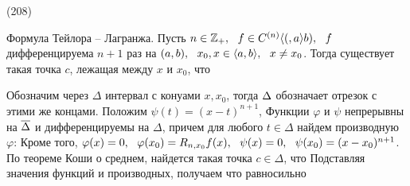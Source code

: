 (208)

\T \q Формула Тейлора -- Лагранжа. Пусть $n \in \mathbb{Z}_+,\ \  f \in C^{(n)} \langle (, a \rangle b),\ \  f$ дифференцируема $n + 1$ раз на $(a, b),\ \  x_0, x \in \langle a, b \rangle,\ \  x \neq x_0$. Тогда существует такая точка $c$, лежащая между $x$ и $x_0$, что 

\D Обозначим через $\Delta$ интервал с конуами $x, x_0$, тогда $\overline{}\Delta$ обозначает отрезок с этими же концами. Положим $\psi(t) = (x - t)^{n + 1}$,  Функции $\varphi$ и $\psi$ непрерывны на $\overline{\Delta}$ и дифференцируемы на $\Delta$, причем  для любого $t \in \Delta$ найдем производную $\varphi$:
 Кроме того, $\varphi(x) = 0,\ \  \varphi(x_0) = R_{n, x_0}f(x),\ \  \psi(x) = 0,\ \  \psi(x_0) = (x - x_0)^{n + 1}$.\\
По теореме Коши о среднем, найдется такая точка $c \in \Delta$, что  Подставляя значения функций и производных, получаем
 что равносильно 